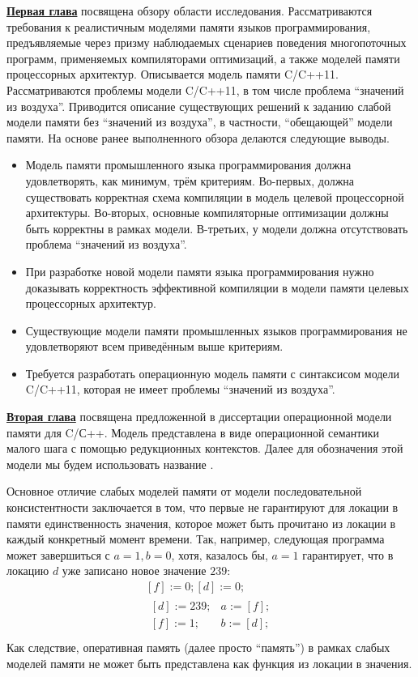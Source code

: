 \underline{\textbf{Первая глава}} посвящена обзору области исследования.
Рассматриваются требования к реалистичным моделями памяти
языков программирования, предъявляемые через призму наблюдаемых сценариев поведения многопоточных программ,
применяемых компиляторами оптимизаций, а также моделей памяти процессорных архитектур.
Описывается модель памяти C/C++11. Рассматриваются проблемы модели C/C++11, в том числе
проблема ``значений из воздуха''. Приводится описание существующих решений к заданию
слабой модели памяти без ``значений из воздуха'', в частности, ``обещающей'' модели памяти.
На основе ранее выполненного обзора делаются следующие выводы.
\begin{itemize}
  \item Модель памяти промышленного языка программирования должна удовлетворять, как минимум, трём критериям.
    Во-первых, должна существовать корректная схема компиляции в модель целевой процессорной
    архитектуры.
    Во-вторых, основные компиляторные оптимизации должны быть корректны в рамках модели.
    В-третьих, у модели должна отсутствовать проблема ``значений из воздуха''.
  \item При разработке новой модели памяти языка программирования нужно доказывать корректность эффективной компиляции
     в модели памяти целевых процессорных архитектур.
  \item Существующие модели памяти промышленных языков программирования не удовлетворяют всем приведённым выше
    критериям.
  \item Требуется разработать операционную модель памяти с синтаксисом модели C/C++11, которая
    не имеет проблемы ``значений из воздуха''.
\end{itemize}

\underline{\textbf{Вторая глава}} посвящена предложенной в диссертации операционной  модели памяти для C/С++. Модель представлена в виде операционной семантики малого шага с помощью редукционных
контекстов. Далее для обозначения этой модели мы будем использовать название \OpCpp.

Основное отличие слабых моделей памяти от модели последовательной консистентности заключается в том, что
первые не гарантируют для локации в памяти единственность значения, которое может быть прочитано из локации
в каждый конкретный момент времени.
Так, например, следующая программа может завершиться с $a = 1, b = 0$, хотя, казалось бы, $a = 1$ гарантирует, что
в локацию $d$ уже записано новое значение $239$:
\[
\begin{array}{c}
[f] := 0; [d] := 0; \\
\begin{array}{l||l}
  {} [d] := 239; & a := [f]; \\
  {} [f] := 1;   & b := [d]; \\
\end{array}
\end{array}
\]
Как следствие, оперативная память (далее просто ``память'') в рамках слабых моделей памяти не может быть представлена как функция из локации в значения.

